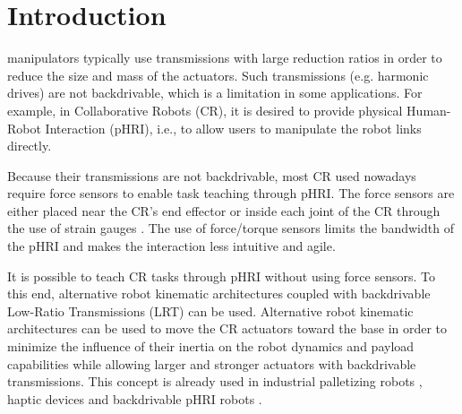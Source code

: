 \section{Introduction}
% 
% 
% 
% 
 manipulators typically use transmissions with large reduction ratios in order to reduce the size and mass of the actuators. Such transmissions (e.g. harmonic drives) are not backdrivable, which is a limitation in some applications. For example, in Collaborative Robots (CR), it is desired to provide physical Human-Robot Interaction (pHRI), i.e., to allow users to manipulate the robot links directly. 
\par 
Because their transmissions are not backdrivable, most CR used nowadays require force sensors to enable task teaching through pHRI. The force sensors are either placed near the CR's end effector \cite{roveda2018high}\cite{meissner2018smart}\cite{raessa2019teaching} or inside each joint of the CR through the use of strain gauges \cite{loughlin2007dlr}. The use of force/torque sensors limits the bandwidth of the pHRI and makes the interaction less intuitive and agile. 
\par
It is possible to teach CR tasks through pHRI without using force sensors. To this end, alternative robot kinematic architectures coupled with backdrivable Low-Ratio Transmissions (LRT) can be used. Alternative robot kinematic architectures can be used to move the CR actuators toward the base in order to minimize the influence of their inertia on the robot dynamics and payload capabilities while allowing larger and stronger actuators with backdrivable transmissions. This concept is already used in industrial palletizing  robots \cite{xiaoqing2011mechanical}, haptic devices \cite{phantom}  and backdrivable pHRI robots \cite{wen2019kinematically}\cite{9306904}. 

